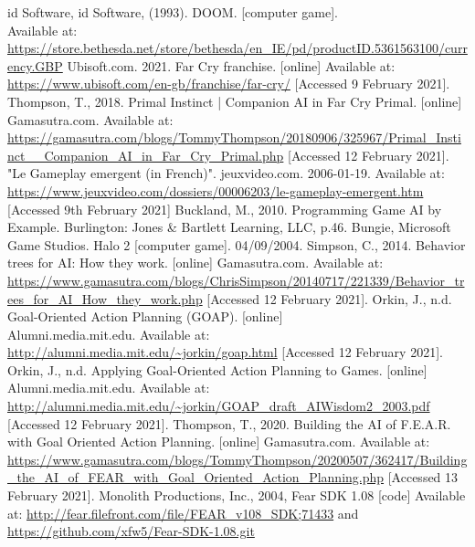 \documentclass[11pt]{report}
\begin{document}
\begin{thebibliography}{}
    id Software, id Software, (1993). DOOM. [computer game]. \\Available at: \url{https://store.bethesda.net/store/bethesda/en_IE/pd/productID.5361563100/currency.GBP}
    Ubisoft.com. 2021. Far Cry franchise. [online] Available at: \url{https://www.ubisoft.com/en-gb/franchise/far-cry/} [Accessed 9 February 2021].
    Thompson, T., 2018. Primal Instinct | Companion AI in Far Cry Primal. [online] Gamasutra.com. Available at: \url{https://gamasutra.com/blogs/TommyThompson/20180906/325967/Primal_Instinct__Companion_AI_in_Far_Cry_Primal.php} [Accessed 12 February 2021].
    "Le Gameplay emergent (in French)". jeuxvideo.com. 2006-01-19. Available at: \url{https://www.jeuxvideo.com/dossiers/00006203/le-gameplay-emergent.htm} [Accessed 9th February 2021]
    Buckland, M., 2010. Programming Game AI by Example. Burlington: Jones \& Bartlett Learning, LLC, p.46.
    Bungie, Microsoft Game Studios. Halo 2 [computer game]. 04/09/2004.
    Simpson, C., 2014. Behavior trees for AI: How they work. [online] Gamasutra.com. Available at: \url{https://www.gamasutra.com/blogs/ChrisSimpson/20140717/221339/Behavior_trees_for_AI_How_they_work.php} [Accessed 12 February 2021].
    Orkin, J., n.d. Goal-Oriented Action Planning (GOAP). [online] \\Alumni.media.mit.edu. Available at: \url{http://alumni.media.mit.edu/~jorkin/goap.html} [Accessed 12 February 2021].
    Orkin, J., n.d. Applying Goal-Oriented Action Planning to Games. [online] \\Alumni.media.mit.edu. Available at: \url{http://alumni.media.mit.edu/~jorkin/GOAP_draft_AIWisdom2_2003.pdf} [Accessed 12 February 2021].
    Thompson, T., 2020. Building the AI of F.E.A.R. with Goal Oriented Action Planning. [online] Gamasutra.com. Available at: \url{https://www.gamasutra.com/blogs/TommyThompson/20200507/362417/Building_the_AI_of_FEAR_with_Goal_Oriented_Action_Planning.php} [Accessed 13 February 2021].
    Monolith Productions, Inc., 2004, Fear SDK 1.08 [code] Available at: \url{http://fear.filefront.com/file/FEAR_v108_SDK;71433} and \url{https://github.com/xfw5/Fear-SDK-1.08.git}

\end{thebibliography}
\end{document}
